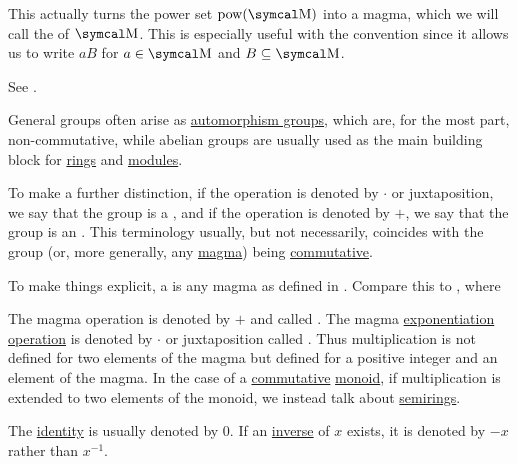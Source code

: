 \begin{definition}
\begin{DefEnum}
    This actually turns the power set \( \Pow(\CM) \) into a magma, which we will call the  of \( \CM \). This is especially useful with the convention  since it allows us to write \( aB \) for \( a \in \CM \) and \( B \subseteq \CM \).

    See .
  \end{DefEnum}
\end{definition}

\begin{remark}\label{rem:additive_magma}
  General groups often arise as \hyperref[def:automorphism_group]{automorphism groups}, which are, for the most part, non-commutative, while abelian groups are usually used as the main building block for \hyperref[def:semiring/ring]{rings} and \hyperref[def:left_module]{modules}.

  To make a further distinction, if the operation is denoted by \( \cdot \) or juxtaposition, we say that the group is a , and if the operation is denoted by \( + \), we say that the group is an . This terminology usually, but not necessarily, coincides with the group (or, more generally, any \hyperref[def:magma]{magma}) being \hyperref[def:magma/commutative]{commutative}.

  To make things explicit, a  is any magma as defined in . Compare this to , where
  \begin{RemEnum}
     The magma operation is denoted by \( + \) and called .
     The magma \hyperref[def:magma/exponentiation]{exponentiation operation} is denoted by \( \cdot \) or juxtaposition called . Thus multiplication is not defined for two elements of the magma but defined for a positive integer and an element of the magma. In the case of a \hyperref[def:magma/commutative]{commutative} \hyperref[def:unital_magma/associative]{monoid}, if multiplication is extended to two elements of the monoid, we instead talk about \hyperref[def:semiring]{semirings}.

     The \hyperref[def:magma_identity]{identity} is usually denoted by \( 0 \).
     If an \hyperref[def:unital_magma_inverse_element]{inverse} of \( x \) exists, it is denoted by \( -x \) rather than \( x^{-1} \).
  \end{RemEnum}
\end{remark}

